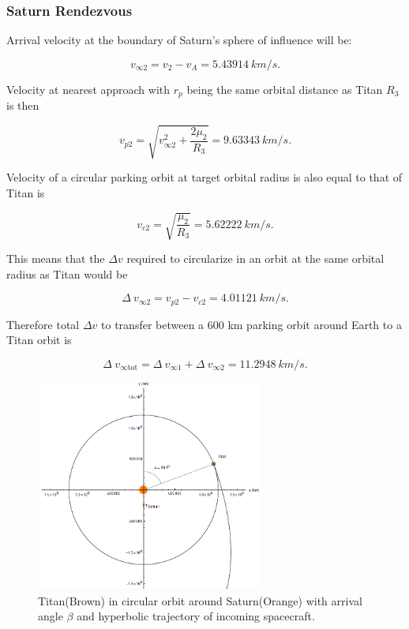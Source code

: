 \documentclass[conf]{new-aiaa}
\begin{document}
\subsubsection{Saturn Rendezvous}

Arrival velocity at the boundary of Saturn's sphere of influence will be:

\begin{equation}
v_{\infty 2} = v_ 2 - v_A = 5.43914 \ km/s.
\end{equation}

Velocity at nearest approach with $r_p$ being the same orbital distance as Titan $R_3$ is then

\begin{equation}
v_{p2} =\sqrt{v_ {\infty 2}^2 + \frac{2\mu_2}{R_3}} = 9.63343\ km/s.
\end{equation}

Velocity of a circular parking orbit at target orbital radius is also equal to that of Titan is 

\begin{equation}
v_{\text{c2}} = \sqrt{\frac{\mu_2}{R_3}} = 5.62222 \ km/s.
\end{equation}

This means that the $\Delta v$ required to circularize in an orbit at the same orbital radius as Titan would be

\begin{equation}
\Delta \!\ v_{\infty 2} = v_{p2} - v_{c2} = 4.01121 \ km/s.
\end{equation}

Therefore total $\Delta v$ to transfer between a 600 km parking orbit around Earth to a Titan orbit is

\begin{equation}
\Delta \!\ v_{\infty \text{tot}} = \Delta \!\ v_{\infty 1} + \Delta \!\ v_{\infty 2} = 11.2948 \ km/s.
\end{equation}

\begin{figure}[htp]
    \centering
    \includegraphics[width=7.5cm]{Project Figure 3.png}
    \caption{Titan(Brown) in circular orbit around Saturn(Orange) with arrival angle $\beta$ and hyperbolic trajectory of incoming spacecraft.}
\end{figure}
\end{document}
